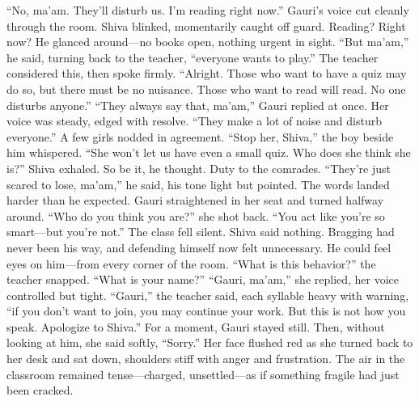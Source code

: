 ``No, ma'am. They'll disturb us. I'm reading right now.'' Gauri's voice cut cleanly through the room. Shiva blinked, momentarily caught off guard. Reading? Right now? He glanced around—no books open, nothing urgent in sight. ``But ma'am,'' he said, turning back to the teacher, ``everyone wants to play.'' The teacher considered this, then spoke firmly. ``Alright. Those who want to have a quiz may do so, but there must be no nuisance. Those who want to read will read. No one disturbs anyone.'' ``They always say that, ma'am,'' Gauri replied at once. Her voice was steady, edged with resolve. ``They make a lot of noise and disturb everyone.'' A few girls nodded in agreement. ``Stop her, Shiva,'' the boy beside him whispered. ``She won't let us have even a small quiz. Who does she think she is?'' Shiva exhaled. So be it, he thought. Duty to the comrades. ``They're just scared to lose, ma'am,'' he said, his tone light but pointed. The words landed harder than he expected. Gauri straightened in her seat and turned halfway around. ``Who do you think you are?'' she shot back. ``You act like you're so smart—but you're not.'' The class fell silent. Shiva said nothing. Bragging had never been his way, and defending himself now felt unnecessary. He could feel eyes on him—from every corner of the room. ``What is this behavior?'' the teacher snapped. ``What is your name?'' ``Gauri, ma'am,'' she replied, her voice controlled but tight. ``Gauri,'' the teacher said, each syllable heavy with warning, ``if you don't want to join, you may continue your work. But this is not how you speak. Apologize to Shiva.'' For a moment, Gauri stayed still. Then, without looking at him, she said softly, ``Sorry.'' Her face flushed red as she turned back to her desk and sat down, shoulders stiff with anger and frustration. The air in the classroom remained tense—charged, unsettled—as if something fragile had just been cracked.

